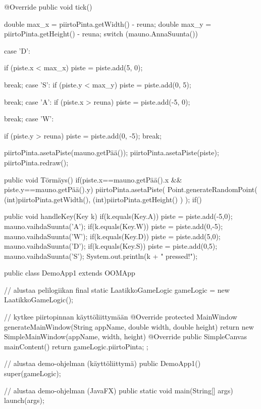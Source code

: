 \begin{javacode}
{    @Override
    public void tick() {
        double max_x = piirtoPinta.getWidth() - reuna;
        double max_y = piirtoPinta.getHeight() - reuna;
        switch (mauno.AnnaSuunta()) {
       
            case 'D':
            	
                if (piste.x < max_x) {
                	piste = piste.add(5, 0);
                }
                
                
                
                break;
            case 'S':
                if (piste.y < max_y)
                    piste = piste.add(0, 5);
                
                break;
            case 'A':
                if (piste.x > reuna)
                    piste = piste.add(-5, 0);
                
                break;
            case 'W':
            	
                if (piste.y > reuna)
                    piste = piste.add(0, -5);
                break;
        }
        
        piirtoPinta.asetaPiste(mauno.getPää());
        piirtoPinta.asetaPiste(piste);
        piirtoPinta.redraw();
    }

public void Törmäys() {
	if(piste.x==mauno.getPää().x && piste.y==mauno.getPää().y) {
		piirtoPinta.asetaPiste( Point.generateRandomPoint(
		(int)piirtoPinta.getWidth(), (int)piirtoPinta.getHeight() ) ); 
	} if() }

public void handleKey(Key k) {
	if(k.equals(Key.A)) {
		piste = piste.add(-5,0);
		mauno.vaihdaSuunta('A');
	}
	if(k.equals(Key.W)) {
		piste = piste.add(0,-5);
		mauno.vaihdaSuunta('W');
	}
	if(k.equals(Key.D)) {
		piste = piste.add(5,0);
		mauno.vaihdaSuunta('D');
	}
	if(k.equals(Key.S)) {
		piste = piste.add(0,5);
		mauno.vaihdaSuunta('S');
	}
	System.out.println(k + " pressed!"); 
}
}


public class DemoApp1 extends OOMApp {
    // alustaa pelilogiikan
    final static LaatikkoGameLogic gameLogic = new LaatikkoGameLogic();

    // kytkee piirtopinnan käyttöliittymään
    @Override
    protected MainWindow generateMainWindow(String appName, double width, double height) {
        return new SimpleMainWindow(appName, width, height) {
            @Override public SimpleCanvas mainContent() {
                return gameLogic.piirtoPinta;
            }
        };
    }

    // alustaa demo-ohjelman (käyttöliittymä)
    public DemoApp1() {
        super(gameLogic);
    }

    // alustaa demo-ohjelman (JavaFX)
    public static void main(String[] args) {
        launch(args);
    }

}
\end{javacode}

